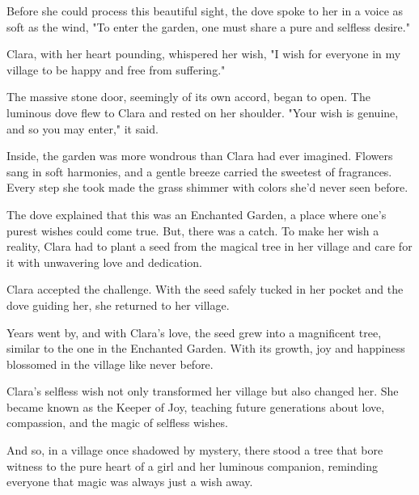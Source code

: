 \documentclass[10pt, fullpage, a4paper, titlepage]{article}
\begin{document}
Before she could process this beautiful sight, the dove spoke to her in a voice as soft as the wind, "To enter the garden, one must share a pure and selfless desire."

Clara, with her heart pounding, whispered her wish, "I wish for everyone in my village to be happy and free from suffering."

The massive stone door, seemingly of its own accord, began to open. The luminous dove flew to Clara and rested on her shoulder. "Your wish is genuine, and so you may enter," it said.

Inside, the garden was more wondrous than Clara had ever imagined. Flowers sang in soft harmonies, and a gentle breeze carried the sweetest of fragrances. Every step she took made the grass shimmer with colors she'd never seen before.

The dove explained that this was an Enchanted Garden, a place where one’s purest wishes could come true. But, there was a catch. To make her wish a reality, Clara had to plant a seed from the magical tree in her village and care for it with unwavering love and dedication.

Clara accepted the challenge. With the seed safely tucked in her pocket and the dove guiding her, she returned to her village.

Years went by, and with Clara's love, the seed grew into a magnificent tree, similar to the one in the Enchanted Garden. With its growth, joy and happiness blossomed in the village like never before.

Clara's selfless wish not only transformed her village but also changed her. She became known as the Keeper of Joy, teaching future generations about love, compassion, and the magic of selfless wishes.

And so, in a village once shadowed by mystery, there stood a tree that bore witness to the pure heart of a girl and her luminous companion, reminding everyone that magic was always just a wish away.
\end{document}

